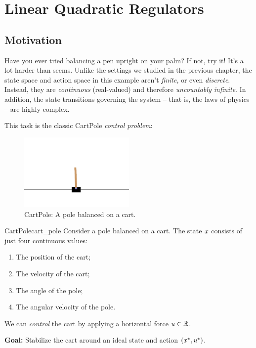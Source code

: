 \documentclass[../main/main]{subfiles}
\begin{document}
    
\tableofcontents

\chapter[LQR]{Linear Quadratic Regulators}

\section{Motivation}

Have you ever tried balancing a pen upright on your palm?
If not, try it! It's a lot harder than seems.
Unlike the settings we studied in the previous chapter,
the state space and action space in this example aren't \emph{finite}, or even \emph{discrete}.
Instead, they are \emph{continuous} (real-valued) and therefore \emph{uncountably infinite}.
In addition, the state transitions governing the system -- that is, the laws of physics --
are highly complex.

This task is the classic CartPole \emph{control problem}:

\begin{figure}[h]
    \centering
    \includegraphics[width=0.5\textwidth]{cart_pole.png}
    \caption{CartPole: A pole balanced on a cart.}
    \label{fig:cart_pole}
\end{figure}

\begin{example}{CartPole}{cart_pole}
    Consider a pole balanced on a cart.
    The state $x$ consists of just four continuous values:

    \begin{enumerate}
        \item The position of the cart;
        \item The velocity of the cart;
        \item The angle of the pole;
        \item The angular velocity of the pole.
    \end{enumerate}

    We can \emph{control} the cart by applying a horizontal force $u \in \mathbb{R}$.

    \textbf{Goal:} Stabilize the cart around an ideal state and action $(x^\star, u^\star)$.
\end{example}
\end{document}
